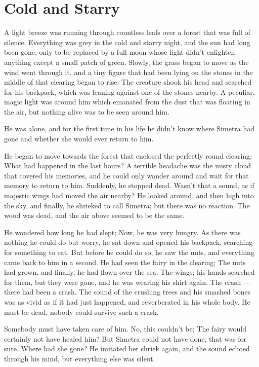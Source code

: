 \chapter{Cold and Starry}
\label{cha:cold-starry}
A light breeze was running through countless leafs over a forest that was full of silence. Everything was grey in the cold and starry night, and the sun had long been gone, only to be replaced by a full moon whose light didn't enlighten anything except a small patch of green. Slowly, the grass began to move as the wind went through it, and a tiny figure that had been lying on the stones in the middle of that clearing began to rise. The creature shook his head and searched for his backpack, which was leaning against one of the stones nearby. A peculiar, magic light was around him which emanated from the dust that was floating in the air, but nothing alive was to be seen around him.

He was alone, and for the first time in his life he didn't know where Simetra had gone and whether she would ever return to him.

He began to move towards the forest that enclosed the perfectly round clearing; What had happened in the last hours? A terrible headache was the misty cloud that covered his memories, and he could only wander around and wait for that memory to return to him. Suddenly, he stopped dead. Wasn't that a sound, as if majestic wings had moved the air nearby? He looked around, and then high into the sky, and finally, he shrieked to call Simetra; but there was no reaction. The wood was dead, and the air above seemed to be the same.

He wondered how long he had slept; Now, he was very hungry. As there was nothing he could do but worry, he sat down and opened his backpack, searching for something to eat. But before he could do so, he saw the nuts, and everything came back to him in a second. He had seen the fairy in the clearing; The nuts had grown, and finally, he had flown over the sea. The wings; his hands searched for them, but they were gone, and he was wearing his shirt again. The crash --- there had been a crash. The sound of the crushing trees and his smashed bones was as vivid as if it had just happened, and reverberated in his whole body. He must be dead, nobody could survive such a crash.

Somebody must have taken care of him. 
No, this couldn't be; The fairy would certainly not have healed him? But Simetra could not have done, that was for sure. Where had she gone? 
He imitated her shriek again, and the sound echoed through his mind, but everything else was silent.

